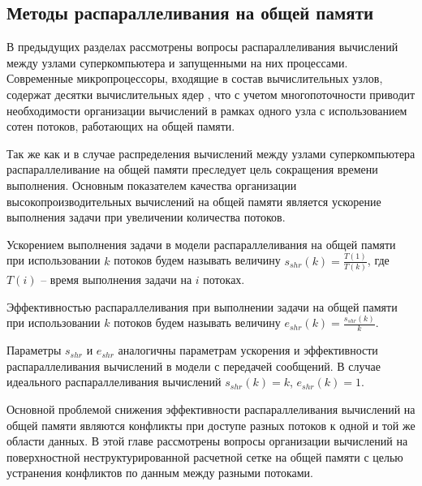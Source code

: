 
\subsection{Методы распараллеливания на общей памяти}

В предыдущих разделах рассмотрены вопросы распараллеливания вычислений между узлами суперкомпьютера и запущенными на них процессами.
Современные микропроцессоры, входящие в состав вычислительных узлов, содержат десятки вычислительных ядер \cite{Section3IntroIntel,Section3IntroAMD,Kuzminsky2022ARM}, что с учетом многопоточности приводит необходимости организации вычислений в рамках одного узла с использованием сотен потоков, работающих на общей памяти.

Так же как и в случае распределения вычислений между узлами суперкомпьютера распараллеливание на общей памяти преследует цель сокращения времени выполнения.
Основным показателем качества организации высокопроизводительных вычислений на общей памяти является ускорение выполнения задачи при увеличении количества потоков.

\begin{definition}
Ускорением выполнения задачи в модели распараллеливания на общей памяти при использовании $k$ потоков будем называть величину $s_{shr}(k) = \frac{T(1)}{T(k)}$, где $T(i)$ -- время выполнения задачи на $i$ потоках.
\end{definition}

\begin{definition}
Эффективностью распараллеливания при выполнении задачи на общей памяти при использовании $k$ потоков будем называть величину $e_{shr}(k) = \frac{s_{shr}(k)}{k}$.
\end{definition}

Параметры $s_{shr}$ и $e_{shr}$ аналогичны параметрам ускорения и эффективности распараллеливания вычислений в модели с передачей сообщений.
В случае идеального распараллеливания вычислений $s_{shr}(k) = k$, $e_{shr}(k) = 1$.

Основной проблемой снижения эффективности распараллеливания вычислений на общей памяти являются конфликты при доступе разных потоков к одной и той же области данных.
В этой главе рассмотрены вопросы организации вычислений на поверхностной неструктурированной расчетной сетке на общей памяти с целью устранения конфликтов по данным между разными потоками.

